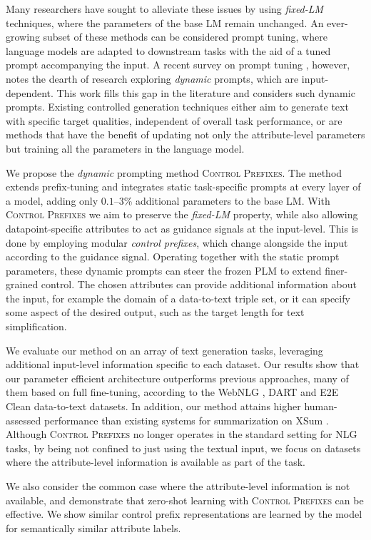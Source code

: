 \documentclass[11pt]{article}
\newcommand{\control}{\textsc{Control Prefixes}\xspace}
\begin{document}
Many researchers have sought to alleviate these issues by using \emph{fixed-LM} techniques, where the parameters of the base LM remain unchanged. An ever-growing subset of these methods can be considered prompt tuning, where language models are adapted to downstream tasks with the aid of a tuned prompt accompanying the input. A recent survey on prompt tuning \citep{prompt_survey}, however, notes the dearth of research exploring \emph{dynamic} prompts, which are input-dependent. This work fills this gap in the literature and considers such dynamic prompts. Existing controlled generation techniques either aim to generate text with specific target qualities, independent of overall task performance, or are methods that have the benefit of updating not only the attribute-level parameters but training all the parameters in the language model. 

We propose the \textit{dynamic} prompting method \control. The method extends prefix-tuning and integrates static task-specific prompts at every layer of a model, adding only $0.1$–$3$\% additional parameters to the base LM. With \control we aim to preserve the \emph{fixed-LM} property, while also allowing datapoint-specific attributes to act as guidance signals at the input-level. This is done by employing modular \emph{control prefixes}, which change alongside the input according to the guidance signal. Operating together with the static prompt parameters, these dynamic prompts can steer the frozen PLM to extend finer-grained control. The chosen attributes can provide additional information about the input, for example the domain of a data-to-text triple set, or it can specify some aspect of the desired output, such as the target length for text simplification. 

We evaluate our method on an array of text generation tasks, leveraging additional input-level information specific to each dataset. Our results show that our parameter efficient architecture outperforms previous approaches, many of them based on full fine-tuning, according to the WebNLG \citep{webnlg-2017}, DART \citep{dart} and E2E Clean \cite{E2Eclean} data-to-text datasets. In addition, our method attains higher human-assessed performance than existing systems for summarization on XSum \citep{xsum}. Although \control no longer operates in the standard setting for NLG tasks, by being not confined to just using the textual input, we focus on datasets where the attribute-level information is available as part of the task.

We also consider the common case where the attribute-level information is not available, and demonstrate that zero-shot learning with \control can be effective. We show similar control prefix representations are learned by the model for semantically similar attribute labels.
\end{document}
